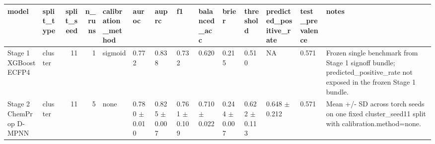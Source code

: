 \begin{tabular}{llrrllllllllll}
\toprule
model & split_type & split_seed & n_runs & calibration_method & auroc & auprc & f1 & balanced_acc & brier & threshold & predicted_positive_rate & test_prevalence & notes \\
\midrule
Stage 1 XGBoost ECFP4 & cluster & 11 & 1 & sigmoid & 0.772 & 0.838 & 0.732 & 0.620 & 0.215 & 0.510 & NA & 0.571 & Frozen single benchmark from Stage 1 signoff bundle; predicted_positive_rate not exposed in the frozen Stage 1 bundle. \\
Stage 2 ChemProp D-MPNN & cluster & 11 & 5 & none & 0.780 $\pm$ 0.010 & 0.825 $\pm$ 0.007 & 0.761 $\pm$ 0.109 & 0.710 $\pm$ 0.022 & 0.244 $\pm$ 0.007 & 0.622 $\pm$ 0.113 & 0.648 $\pm$ 0.212 & 0.571 & Mean +/- SD across torch seeds on one fixed cluster_seed11 split with calibration.method=none. \\
\bottomrule
\end{tabular}
